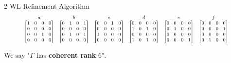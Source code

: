 \documentclass{beamer}
\begin{document}
\begin{frame}{2-WL Refinement Algorithm}
    \vspace{1em}
    \centering
    \[
    \scalebox{0.7}{
    $
        \begin{array}{cccccc}
        a & b & c & d & e & f \\
        \begin{bmatrix}
        1&0&0&0\\
        0&0&0&0\\
        0&0&1&0\\
        0&0&0&0
        \end{bmatrix}
        &
        \begin{bmatrix}
        0&1&0&1\\
        0&0&0&0\\
        0&1&0&1\\
        0&0&0&0
        \end{bmatrix}
        &
        \begin{bmatrix}
        0&0&1&0\\
        0&0&0&0\\
        1&0&0&0\\
        0&0&0&0
        \end{bmatrix}
        &
        \begin{bmatrix}
        0&0&0&0\\
        1&0&1&0\\
        0&0&0&0\\
        1&0&1&0
        \end{bmatrix}
        &
        \begin{bmatrix}
        0&0&0&0\\
        0&1&0&0\\
        0&0&0&0\\
        0&0&0&1
        \end{bmatrix}
        &
        \begin{bmatrix}
        0&0&0&0\\
        0&0&0&1\\
        0&0&0&0\\
        0&1&0&0
        \end{bmatrix}
        \end{array}
    $
    }
    \]

    \vspace{1em}
    \centering
    We say "$\Gamma$ has \textbf{coherent rank} 6".
\end{frame}
\addtocounter{framenumber}{-1}

\end{document}
